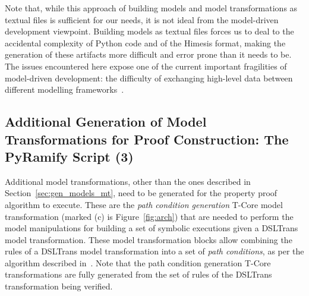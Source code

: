 Note that, while this approach of building models and model transformations as
textual files is sufficient for our needs, it is not ideal from the model-driven
development viewpoint. Building models as textual files forces us to deal to
the accidental complexity of Python code and of the Himesis format, making the
generation of these artifacts more difficult and error prone than it needs to
be. The issues encountered here expose one of the current important fragilities
of model-driven development: the difficulty of exchanging high-level data
between different modelling frameworks~.





\subsection{Additional Generation of Model Transformations for Proof
Construction: The PyRamify Script (3)}

Additional model transformations, other than the ones described in
Section~\ref{sec:gen_models_mt}, need to be generated for the property proof
algorithm to execute. These are the \emph{path condition generation} T-Core
model transformation (marked (c) is Figure~\ref{fig:arch}) that are
needed to perform the model manipulations for building a set of symbolic
executions given a DSLTrans model transformation. These model transformation
blocks allow combining the rules of a DSLTrans model
transformation into a set of \emph{path conditions}, as per the algorithm
described in~\cite{Lucio2014}. Note that the path condition generation T-Core
transformations are fully generated from the set of rules of the DSLTrans
transformation being verified.

